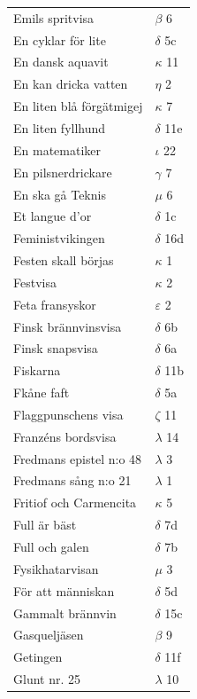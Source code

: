 \documentclass[a6paper,10pt]{article}
\begin{document}
\newpage
\begin{table}[!h]
\begin{tabular}{l l}
Emils spritvisa&$\beta$ 6\\
En cyklar för lite&	$\delta$ 5c\\
En dansk aquavit&$\kappa$ 11\\
En kan dricka vatten&	$\eta$ 2\\
En liten blå förgätmigej&$\kappa$ 7\\
En liten fyllhund&$\delta$ 11e\\
En matematiker&$\iota$ 22\\
En pilsnerdrickare&$\gamma$ 7\\
En ska gå Teknis&	$\mu$ 6\\
Et langue d'or&$\delta$ 1c\\
Feministvikingen&$\delta$ 16d\\
Festen skall börjas&$\kappa$ 1\\
Festvisa&$\kappa$ 2\\
Feta fransyskor&$\varepsilon$ 2\\
Finsk brännvinsvisa&$\delta$ 6b\\
Finsk snapsvisa&$\delta$ 6a\\
Fiskarna&$\delta$ 11b\\
Fkåne faft&$\delta$ 5a\\
Flaggpunschens visa&$\zeta$ 11\\
Franzéns bordsvisa&$\lambda$ 14\\
Fredmans epistel n:o 48	&$\lambda$ 3\\
Fredmans sång n:o 21&$\lambda$ 1\\
Fritiof och Carmencita&$\kappa$ 5\\
Full är bäst&$\delta$ 7d\\
Full och galen&$\delta$ 7b\\
Fysikhatarvisan&$\mu$ 3\\
För att människan&$\delta$ 5d\\
Gammalt brännvin&$\delta$ 15c\\
Gasqueljäsen&$\beta$ 9\\
Getingen&$\delta$ 11f\\
Glunt nr. 25&$\lambda$ 10\\
\end{tabular}
\end{table}
\end{document}
